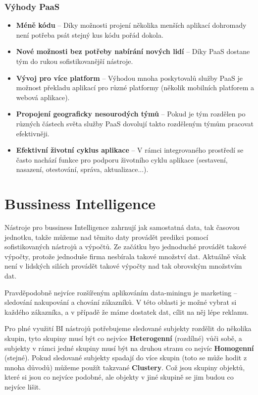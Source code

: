 \subsubsection{Výhody PaaS}
\begin{itemize}
  \item \textbf{Méně kódu} -- Díky možnosti projení několika menších aplikací dohromady není potřeba psát stejný kus kódu pořád dokola.
  \item \textbf{Nové možnosti bez potřeby nabírání nových lidí} -- Díky PaaS dostane tým do rukou sofistikovanější nástroje.
  \item \textbf{Vývoj pro více platform} -- Výhodou mnoha poskytovalů služby PaaS je možnost překladu aplikací pro různé platformy (několik mobilních platforem a webová aplikace).
  \item \textbf{Propojení geograficky nesourodých týmů} -- Pokud je tým rozdělen po různých částech světa služby PaaS dovolují takto rozděleným týmům pracovat efektivněji.
  \item \textbf{Efektivní životní cyklus aplikace} -- V rámci integrovaného prostředí se často nachází funkce pro podporu životního cyklu aplikace (sestavení, nasazení, otestování, správa, aktualizace...). \cite{co-je-paas}
\end{itemize}

\section{Bussiness Intelligence}
\par Nástroje pro bussiness Intelligence zahrnují jak samostatná data, tak časovou jednotku, takže můžeme nad těmito daty provádět predikci pomocí sofistikovaných nástrojů a výpočtů. Ze začátku byo jednoduché provádět takové výpočty, protože jednoduše firma nesbírala takové množství dat. Aktuálně však není v lidských silách provádět takové výpočty nad tak obrovským množstvím dat. \cite{data-science-business}

\par Pravděpodobně nejvíce rozšířeným aplikováním data-miningu je marketing -- sledování nakupování a chování zákazníků. V této oblasti je možné vybrat si každého zákazníka, a v případě že máme dostatek dat, cílit na něj lépe reklamu. \cite{data-science-business}

\par Pro plné využití BI nástrojů potřebujeme sledované subjekty rozdělit do několika skupin, tyto skupiny musí být co nejvíce \textbf{Heterogenní} (rozdílné) vůči sobě, a subjekty v rámci jedné skupiny musí být na druhou stranu co nejvíc \textbf{Homogenní} (stejné). Pokud sledované subjekty spadají do více skupin (toto se může hodit z mnoha důvodů) můžeme použít takzvané  \textbf{Clustery}. Což jsou skupiny objektů, které si jsou co nejvíce podobné, ale objekty v jiné skupině se jim budou co nejvíce lišit. \cite{data-science-business}

